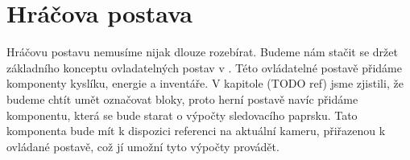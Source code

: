 
\section{Hráčova postava}
Hráčovu postavu nemusíme nijak dlouze rozebírat. Budeme nám stačit se držet základního konceptu ovladatelných postav v \UEu{}. Této ovládatelné postavě přidáme komponenty kyslíku, energie a inventáře. V kapitole (TODO ref) jsme zjistili, že budeme chtít umět označovat bloky, proto herní postavě navíc přidáme komponentu, která se bude starat o výpočty sledovacího paprsku. Tato komponenta bude mít k dispozici referenci na aktuální kameru, přiřazenou k ovládané postavě, což jí umožní tyto výpočty provádět.
